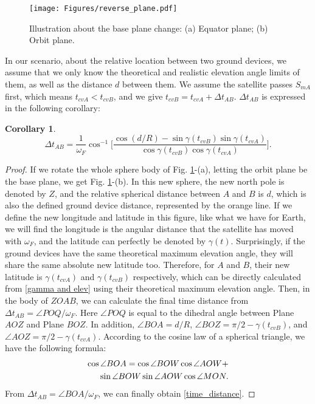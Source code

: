 \documentclass{IEEEtaes}
\theoremstyle{plain}
\newtheorem{corollary}{Corollary}
\begin{document}
\begin{figure}[ht]
  \centering
  \texttt{[image: Figures/reverse\_plane.pdf]}
  \caption{ Illustration about the base plane change: (a) Equator plane;      (b) Orbit plane.}
  \label{Twoplanes}
\end{figure}

In our scenario, about the relative location between two ground devices, we assume that we only know the theoretical and realistic elevation angle limits of them, as well as the distance $d$ between them. We assume the satellite passes $S_{m\!A}$ first, which means $t_{c\!v\!A}<t_{c\!v\!B}$, and we give $t_{c\!v\!B} = t_{c\!v\!A} + \Delta t_{A\!B}$. $\Delta t_{A\!B}$ is expressed in the following corollary:
\begin{corollary}
    \begin{equation}
  \label{time_distance}
  \Delta t_{A\!B} = \frac{1}{\omega_F}\cos^{-1}\Big[\frac{\cos(d/R)-\sin\gamma(t_{c\!v\!B})\sin\gamma(t_{c\!v\!A})}{\cos\gamma(t_{c\!v\!B})\cos\gamma(t_{c\!v\!A})}\Big].
\end{equation}
\end{corollary}
\begin{proof}
    If we rotate the whole sphere body of Fig. \ref{Twoplanes}-(a), letting the orbit plane be the base plane, we get Fig. \ref{Twoplanes}-(b). In this new sphere, the new north pole is denoted by $Z$, and the relative spherical distance between $A$ and $B$ is $d$, which is also the defined ground device distance, represented by the orange line. If we define the new longitude and latitude in this figure, like what we have for Earth, we will find the longitude is the angular distance that the satellite has moved with $\omega_F$, and the latitude can perfectly be denoted by $\gamma(t)$. Surprisingly, if the ground devices have the same theoretical maximum elevation angle, they will share the same absolute new latitude too. Therefore, for $A$ and $B$, their new latitude is $\gamma(t_{c\!v\!A})$ and $\gamma(t_{c\!v\!B})$ respectively, which can be directly calculated from \eqref{gamma and elev} using their theoretical maximum elevation angle. 
Then, in the body of $ZOAB$, we can calculate the final time distance from $\Delta t_{A\!B}=\angle POQ/\omega_F$. Here $\angle POQ$ is equal to the dihedral angle between Plane $AOZ$ and Plane $BOZ$. In addition, $\angle BOA = d/R$, $\angle BOZ = \pi/2-\gamma(t_{c\!v\!B})$, and $\angle AOZ = \pi/2-\gamma(t_{c\!v\!A})$. According to the cosine law of a spherical triangle, we have the following formula:
\begin{equation}
  \label{time_distance_calculation}
  \begin{aligned}
\cos\angle BOA= \cos\angle BOW \cos\angle AOW + \\
\hfill \sin\angle BOW \sin\angle AOW \cos\angle MON.
\end{aligned}
\end{equation}
From $\Delta t_{A\!B} = \angle BOA / \omega_F$, we can finally obtain \eqref{time_distance}.
\end{proof}
\end{document}
